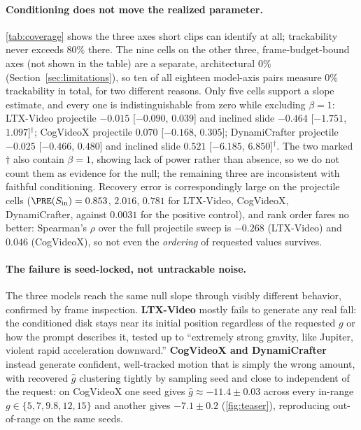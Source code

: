 \documentclass[10pt,twocolumn,letterpaper]{article}
\begin{document}
\paragraph{Conditioning does not move the realized parameter.}
\autoref{tab:coverage} shows the three axes short clips can identify at
all; trackability never exceeds $80\%$ there. The nine cells on the other
three, frame-budget-bound axes (not shown in the table) are a separate,
architectural $0\%$ (Section~\ref{sec:limitations}), so ten of all
eighteen model-axis pairs measure $0\%$ trackability in total, for two
different reasons. Only five cells support a slope estimate, and every one is
indistinguishable
from zero while excluding $\beta=1$: LTX-Video projectile
$-0.015$ [$-0.090$, $0.039$] and inclined slide $-0.464$ [$-1.751$,
$1.097$]$^{\dagger}$; CogVideoX projectile $0.070$ [$-0.168$, $0.305$];
DynamiCrafter projectile $-0.025$ [$-0.466$, $0.480$] and inclined slide
$0.521$ [$-6.185$, $6.850$]$^{\dagger}$. The two marked $\dagger$ also
contain $\beta=1$, showing lack of power rather than absence, so we do not
count them as evidence for the null; the remaining three are inconsistent
with faithful conditioning. Recovery error is correspondingly large on
the projectile cells ($\PRE(S_\text{in})=0.853$, $2.016$, $0.781$ for
LTX-Video, CogVideoX, DynamiCrafter, against $0.0031$ for the positive
control), and rank order fares no better: Spearman's $\rho$ over the full
projectile sweep is $-0.268$ (LTX-Video) and $0.046$ (CogVideoX), so not
even the \emph{ordering} of requested values survives.

\paragraph{The failure is seed-locked, not untrackable noise.}
The three models reach the same null slope through visibly different
behavior, confirmed by frame inspection. \textbf{LTX-Video} mostly fails to
generate any real fall: the conditioned disk stays near its initial position
regardless of the requested $g$ or how the prompt describes it, tested up to
``extremely strong gravity, like Jupiter, violent rapid acceleration
downward.'' \textbf{CogVideoX and DynamiCrafter} instead generate confident,
well-tracked motion that is simply the wrong amount, with recovered $\hat g$
clustering tightly by sampling seed and close to independent of the request:
on CogVideoX one seed gives $\hat g \approx -11.4 \pm 0.03$ across every
in-range $g\in\{5,7,9.8,12,15\}$ and another gives $-7.1\pm0.2$
(\autoref{fig:teaser}), reproducing out-of-range on the same seeds.
\end{document}
